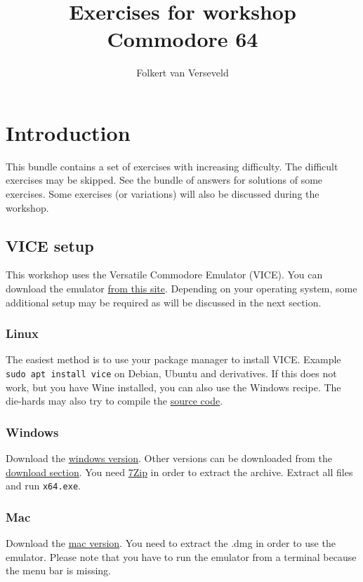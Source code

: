 \documentclass{article}
\title{Exercises for workshop Commodore 64}
\author{Folkert van Verseveld}
\newcounter{solution}
\begin{document}
\maketitle

\section{Introduction}

This bundle contains a set of exercises with increasing difficulty.
The difficult exercises may be skipped.
See the bundle of answers for solutions of some exercises.
Some exercises (or variations) will also be discussed during the workshop.

\subsection{VICE setup}
This workshop uses the Versatile Commodore Emulator (VICE).
You can download the emulator \href{http://vice-emu.sourceforge.net/}{from this site}.
Depending on your operating system, some additional setup may be required as will be discussed in the next section.

\subsubsection{Linux}
The easiest method is to use your package manager to install VICE. Example \verb:sudo apt install vice: on Debian, Ubuntu and derivatives.
If this does not work, but you have Wine installed, you can also use the Windows recipe.
The die-hards may also try to compile the \href{http://sourceforge.net/projects/vice-emu/files/releases/vice-3.1.tar.gz/download}{source code}.

\subsubsection{Windows}
Download the \href{http://sourceforge.net/projects/vice-emu/files/releases/binaries/windows/WinVICE-3.1-x64.7z/download}{windows version}.
Other versions can be downloaded from the \href{http://vice-emu.sourceforge.net/windows.html}{download section}.
You need \href{http://www.7-zip.org/}{7Zip} in order to extract the archive.
Extract all files and run \verb:x64.exe:.

\subsubsection{Mac}
Download the \href{http://sourceforge.net/projects/vice-emu/files/releases/binaries/macosx/vice-macosx-sdl-x86_64-10.12-3.1.dmg/download}{mac version}.
You need to extract the .dmg in order to use the emulator.
Please note that you have to run the emulator from a terminal because the menu bar is missing.
\end{document}
